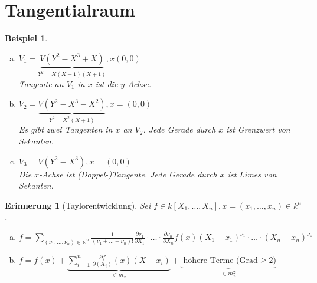 \documentclass[a4paper,12pt]{report}
\theoremstyle{break}
\newtheorem{Erinn}[Def]{Erinnerung}
\newtheorem{Bsp}[Def]{Beispiel}
\theoremstyle{nonumberbreak}
\theoremstyle{nonumberplain}
\newcommand{\quot}[1]{\textrm{\glqq}{#1}\textrm{\grqq}}
\newcommand{\Sum}{\sum\limits}
\newcommand{\N}{\mathbb{N}}
\begin{document}
\newpage


\section{Tangentialraum}

\begin{Bsp}\begin{enumerate}[a)] %
\item
	$V_1=\underbrace{V(Y^2-X^3+X)}_{Y^2=X(X-1)(X+1)}, x(0,0)$\\
	Tangente an $V_1$ in $x$ \quot{ist} die $y$-Achse.
\item
	$V_2=\underbrace{V(Y^2-X^3-X^2)}_{Y^2=X^2(X+1)}, x=(0,0)$\\
	Es gibt zwei Tangenten in $x$ an $V_2$. Jede Gerade durch $x$ ist Grenzwert von Sekanten.
\item
	$V_3=V(Y^2-X^3), x=(0,0)$\\
	Die $x$-Achse ist (Doppel-)Tangente. Jede Gerade durch $x$ ist Limes von Sekanten.
\end{enumerate}\end{Bsp}

\begin{Erinn}[Taylorentwicklung]
Sei $f\in k[X_1,\ldots ,X_n], x=(x_1,\ldots ,x_n)\in k^n$.\begin{enumerate}[a)]
\item
	$f=\Sum_{(\nu_1,\ldots ,\nu_n)\in \N^n} \frac{1}{(\nu_1+\ldots +\nu_n)!}\frac{\partial\nu_1}{\partial X_1}\cdot\ldots \cdot \frac{\partial\nu_n}{\partial X_n} f(x)(X_1-x_1)^{\nu_1}\cdot\ldots \cdot(X_n-x_n)^{\nu_n}$
\item
	$f=f(x)+ \underbrace{\Sum_{i=1}^n\frac{\partial f}{\partial(X_i)}(x)(X-x_i)}_{\in m_x} + \underbrace{\text{ h\"ohere Terme (Grad} \ge2)}_{\in m_x^2}$
\end{enumerate}\end{Erinn}
\end{document}

